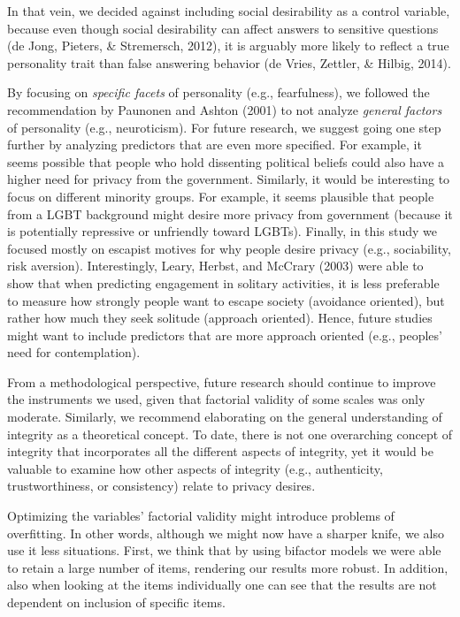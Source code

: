 \documentclass[man,floatsintext]{apa6}
\theoremstyle{definition}
\theoremstyle{definition}
\theoremstyle{definition}
\theoremstyle{remark}
\begin{document}
In that vein, we decided against including social desirability as a
control variable, because even though social desirability can affect
answers to sensitive questions (de Jong, Pieters, \& Stremersch, 2012),
it is arguably more likely to reflect a true personality trait than
false answering behavior (de Vries, Zettler, \& Hilbig, 2014).

By focusing on \emph{specific facets} of personality (e.g.,
fearfulness), we followed the recommendation by Paunonen and Ashton
(2001) to not analyze \emph{general factors} of personality (e.g.,
neuroticism). For future research, we suggest going one step further by
analyzing predictors that are even more specified. For example, it seems
possible that people who hold dissenting political beliefs could also
have a higher need for privacy from the government. Similarly, it would
be interesting to focus on different minority groups. For example, it
seems plausible that people from a LGBT background might desire more
privacy from government (because it is potentially repressive or
unfriendly toward LGBTs). Finally, in this study we focused mostly on
escapist motives for why people desire privacy (e.g., sociability, risk
aversion). Interestingly, Leary, Herbst, and McCrary (2003) were able to
show that when predicting engagement in solitary activities, it is less
preferable to measure how strongly people want to escape society
(avoidance oriented), but rather how much they seek solitude (approach
oriented). Hence, future studies might want to include predictors that
are more approach oriented (e.g., peoples' need for contemplation).

From a methodological perspective, future research should continue to
improve the instruments we used, given that factorial validity of some
scales was only moderate. Similarly, we recommend elaborating on the
general understanding of integrity as a theoretical concept. To date,
there is not one overarching concept of integrity that incorporates all
the different aspects of integrity, yet it would be valuable to examine
how other aspects of integrity (e.g., authenticity, trustworthiness, or
consistency) relate to privacy desires.

Optimizing the variables' factorial validity might introduce problems of
overfitting. In other words, although we might now have a sharper knife,
we also use it less situations. First, we think that by using bifactor
models we were able to retain a large number of items, rendering our
results more robust. In addition, also when looking at the items
individually one can see that the results are not dependent on inclusion
of specific items.
\end{document}
